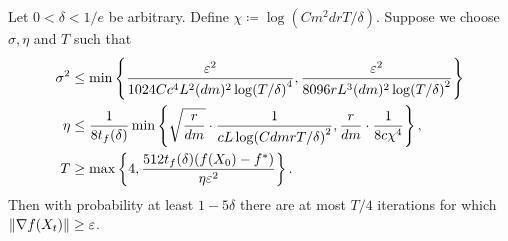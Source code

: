 \begin{theorem}\label{thm:symm-eggroll-conv}
    Let $0 < \delta < 1/e$ be arbitrary. Define $\chi\coloneqq\log(Cm^2drT/\delta)$. Suppose we choose $\sigma, \eta$ and $T$ such that
    \begin{align*}
        \sigma^2 &\leq \min \left\{\frac{\varepsilon^2}{1024 C c^4 L^2 (dm)^2 \log(T/\delta)^4}, \frac{\varepsilon^2}{8096 rL^3 (dm)^2 \log(T/\delta)^2}\right\} \\
        \eta &\leq \frac{1}{8t_f(\delta)} \min\left\{\sqrt{\frac{r}{dm}} \cdot \frac{1}{c L \log(CdmrT/\delta)^2}, \frac{r}{dm} \cdot \frac{1}{8c\chi^4}\right\}, \\
        T &\geq \max \left\{4, \frac{512t_f(\delta)(f(X_0) - f^*)}{\eta \varepsilon^2}\right\}.
    \end{align*}
    Then with probability at least $1-5\delta$ there are at most $T/4$ iterations for which $\left\lVert \nabla f(X_t) \right\rVert \geq \varepsilon$. 
\end{theorem}

